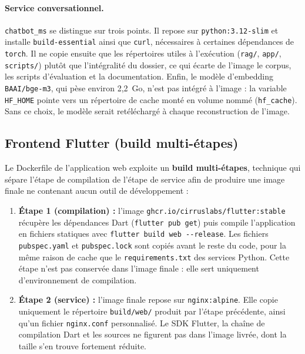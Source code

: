 \paragraph{Service conversationnel.}
\texttt{chatbot\_ms} se distingue sur trois points. Il repose sur
\texttt{python:3.12-slim} et installe \texttt{build-essential} ainsi que
\texttt{curl}, nécessaires à certaines dépendances de \texttt{torch}. Il ne
copie ensuite que les répertoires utiles à l'exécution (\texttt{rag/},
\texttt{app/}, \texttt{scripts/}) plutôt que l'intégralité du dossier, ce qui
écarte de l'image le corpus, les scripts d'évaluation et la documentation.
Enfin, le modèle d'embedding \texttt{BAAI/bge-m3}, qui pèse environ 2,2~Go,
n'est pas intégré à l'image : la variable \texttt{HF\_HOME} pointe vers un
répertoire de cache monté en volume nommé (\texttt{hf\_cache}). Sans ce
choix, le modèle serait retéléchargé à chaque reconstruction de l'image.

\subsection*{Frontend Flutter (build multi-étapes)}

Le Dockerfile de l'application web exploite un \textbf{build multi-étapes},
technique qui sépare l'étape de compilation de l'étape de service afin de
produire une image finale ne contenant aucun outil de développement :

\begin{enumerate}
  \item \textbf{Étape 1 (compilation) :} l'image
        \texttt{ghcr.io/cirruslabs/flutter:stable} récupère les dépendances
        Dart (\texttt{flutter pub get}) puis compile l'application en
        fichiers statiques avec \texttt{flutter build web -{}-release}. Les
        fichiers \texttt{pubspec.yaml} et \texttt{pubspec.lock} sont copiés
        avant le reste du code, pour la même raison de cache que le
        \texttt{requirements.txt} des services Python. Cette étape n'est pas
        conservée dans l'image finale : elle sert uniquement d'environnement
        de compilation.

  \item \textbf{Étape 2 (service) :} l'image finale repose sur
        \texttt{nginx:alpine}. Elle copie uniquement le répertoire
        \texttt{build/web/} produit par l'étape précédente, ainsi qu'un
        fichier \texttt{nginx.conf} personnalisé. Le SDK Flutter, la chaîne
        de compilation Dart et les sources ne figurent pas dans l'image
        livrée, dont la taille s'en trouve fortement réduite.
\end{enumerate}

